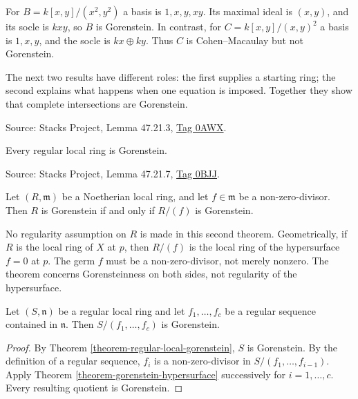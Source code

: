 \begin{example}
\label{example-gorenstein-socles}
For $B=k[x,y]/(x^2,y^2)$ a basis is
$1,x,y,xy$. Its maximal ideal is $(x,y)$,
and its socle is $kxy$, so $B$ is
Gorenstein. In contrast, for
$C=k[x,y]/(x,y)^2$ a basis is $1,x,y$,
and the socle is $kx\oplus ky$.
Thus $C$ is Cohen--Macaulay but not
Gorenstein.
\end{example}

The next two results have different roles:
the first supplies a starting ring;
the second explains what happens when
one equation is imposed.
Together they show that complete
intersections are Gorenstein.

\begin{theorem}
\label{theorem-regular-local-gorenstein}
Source: Stacks Project, Lemma 47.21.3,
\href{https://stacks.math.columbia.edu/tag/0AWX}
{Tag 0AWX}.
\par\smallskip
Every regular local ring is Gorenstein.
\end{theorem}

\begin{theorem}
\label{theorem-gorenstein-hypersurface}
Source: Stacks Project, Lemma 47.21.7,
\href{https://stacks.math.columbia.edu/tag/0BJJ}
{Tag 0BJJ}.
\par\smallskip
Let $(R,\mathfrak m)$ be a Noetherian
local ring, and let $f\in\mathfrak m$
be a non-zero-divisor. Then
$R$ is Gorenstein if and only if
$R/(f)$ is Gorenstein.
\end{theorem}

No regularity assumption on $R$ is made
in this second theorem. Geometrically,
if $R$ is the local ring of $X$ at $p$,
then $R/(f)$ is the local ring of the
hypersurface $f=0$ at $p$.
The germ $f$ must be a non-zero-divisor,
not merely nonzero. The theorem concerns
Gorensteinness on both sides, not
regularity of the hypersurface.

\begin{corollary}
\label{theorem-gorenstein-ci}
Let $(S,\mathfrak n)$ be a regular local
ring and let $f_1,\ldots,f_c$ be a regular
sequence contained in $\mathfrak n$.
Then $S/(f_1,\ldots,f_c)$ is Gorenstein.
\end{corollary}

\begin{proof}
By Theorem
\ref{theorem-regular-local-gorenstein},
$S$ is Gorenstein.
By the definition of a regular sequence,
$f_i$ is a non-zero-divisor in
$S/(f_1,\ldots,f_{i-1})$.
Apply Theorem
\ref{theorem-gorenstein-hypersurface}
successively for $i=1,\ldots,c$.
Every resulting quotient is Gorenstein.
\end{proof}

